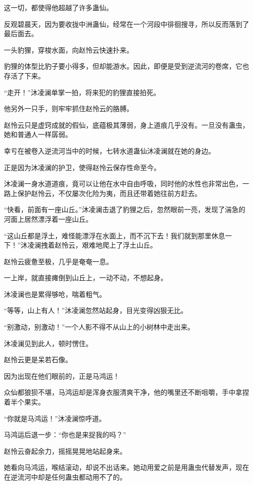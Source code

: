 \begin{this_body}
这一切，都使得他超越了许多蛊仙。

反观碧晨天，因为要收拢中洲蛊仙，经常在一个河段中徘徊搜寻，所以反而落到了最后面去。

一头豹狸，穿梭水面，向赵怜云快速扑来。

豹狸的体型比豹子要小得多，但却能游水。因此，即便是受到逆流河的卷席，它也存活了下来。

“走开！”沐凌澜单掌一拍，将来犯的豹狸直接拍死。

他另外一只手，则牢牢抓住赵怜云的胳膊。

赵怜云只是虚窍成就的假仙，底蕴极其薄弱，身上道痕几乎没有。一旦没有蛊虫，她和普通人一样孱弱。

幸亏在被卷入逆流河当中的时候，七转水道蛊仙沐凌澜就在她的身边。

正是因为沐凌澜的护卫，使得赵怜云保存性命至今。

沐凌澜一身水道道痕，竟可以让他在水中自由呼吸，同时他的水性也非常出色，一路上保护赵怜云，不仅屡次化险为夷，而且还带着她往前方赶去。

“快看，前面有一座山丘。”沐凌澜击退了豹狸之后，忽然眼前一亮，发现了湍急的河面上居然漂浮着一座山丘。

“这山丘都是浮土，难怪能漂浮在水面上，而不沉下去！我们就到那里休息一下！”沐凌澜拽着赵怜云，艰难地爬上了浮土山丘。

赵怜云疲惫至极，几乎是奄奄一息。

一上岸，就直接瘫倒到山丘上，一动不动，不想起身。

沐凌澜也是累得够呛，喘着粗气。

“等等，山上有人！”沐凌澜忽然站起身，目光变得凶狠无比。

“别激动，别激动！”一个人影不得不从山上的小树林中走出来。

沐凌澜见到此人，顿时愣住。

赵怜云更是呆若石像。

因为出现在他们眼前的，正是马鸿运！

众仙都狼狈不堪，马鸿运却是浑身衣服清爽干净，他的嘴里还不断咀嚼，手中拿捏着半个果实。

“你就是马鸿运！”沐凌澜惊呼道。

马鸿运后退一步：“你也是来捉我的吗？”

赵怜云奋起余力，摇摇晃晃地站起身来。

她看向马鸿运，喉结滚动，却说不出话来。她动用爱之前是用蛊虫代替发声，现在在逆流河中却是任何蛊虫都动用不了的。


\end{this_body}
